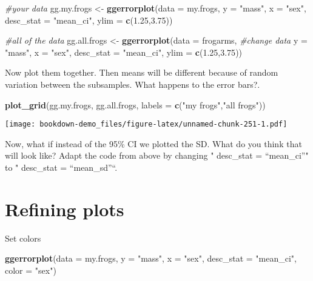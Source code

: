 \documentclass[]{book}
\newenvironment{Shaded}{\begin{snugshade}}{\end{snugshade}}
\newcommand{\KeywordTok}[1]{\textcolor[rgb]{0.13,0.29,0.53}{\textbf{#1}}}
\newcommand{\DataTypeTok}[1]{\textcolor[rgb]{0.13,0.29,0.53}{#1}}
\newcommand{\FloatTok}[1]{\textcolor[rgb]{0.00,0.00,0.81}{#1}}
\newcommand{\StringTok}[1]{\textcolor[rgb]{0.31,0.60,0.02}{#1}}
\newcommand{\CommentTok}[1]{\textcolor[rgb]{0.56,0.35,0.01}{\textit{#1}}}
\newcommand{\NormalTok}[1]{#1}
\theoremstyle{definition}
\theoremstyle{definition}
\theoremstyle{definition}
\theoremstyle{remark}
\begin{document}
\begin{Shaded}
\begin{Highlighting}[]
\CommentTok{#your data}
\NormalTok{gg.my.frogs <-}\StringTok{ }\KeywordTok{ggerrorplot}\NormalTok{(}\DataTypeTok{data =}\NormalTok{ my.frogs,}
          \DataTypeTok{y =} \StringTok{"mass"}\NormalTok{,}
          \DataTypeTok{x =} \StringTok{"sex"}\NormalTok{,}
          \DataTypeTok{desc_stat =} \StringTok{"mean_ci"}\NormalTok{,}
          \DataTypeTok{ylim =} \KeywordTok{c}\NormalTok{(}\FloatTok{1.25}\NormalTok{,}\FloatTok{3.75}\NormalTok{))}

\CommentTok{#all of the data}
\NormalTok{gg.all.frogs <-}\StringTok{ }\KeywordTok{ggerrorplot}\NormalTok{(}\DataTypeTok{data =}\NormalTok{ frogarms, }\CommentTok{#change data}
          \DataTypeTok{y =} \StringTok{"mass"}\NormalTok{,}
          \DataTypeTok{x =} \StringTok{"sex"}\NormalTok{,}
          \DataTypeTok{desc_stat =} \StringTok{"mean_ci"}\NormalTok{,}
          \DataTypeTok{ylim =} \KeywordTok{c}\NormalTok{(}\FloatTok{1.25}\NormalTok{,}\FloatTok{3.75}\NormalTok{))}
\end{Highlighting}
\end{Shaded}

Now plot them together. Then means will be different because of random
variation between the subsamples. What happens to the error bars?.

\begin{Shaded}
\begin{Highlighting}[]
\KeywordTok{plot_grid}\NormalTok{(gg.my.frogs, }
\NormalTok{          gg.all.frogs,}
          \DataTypeTok{labels =} \KeywordTok{c}\NormalTok{(}\StringTok{"my frogs"}\NormalTok{,}\StringTok{"all frogs"}\NormalTok{))}
\end{Highlighting}
\end{Shaded}

\texttt{[image: bookdown-demo\_files/figure-latex/unnamed-chunk-251-1.pdf]}

Now, what if instead of the 95\% CI we plotted the SD. What do you think
that will look like? Adapt the code from above by changing " desc\_stat
= ``mean\_ci''" to " desc\_stat = ``mean\_sd''``.

\section{Refining plots}\label{refining-plots}

Set colors

\begin{Shaded}
\begin{Highlighting}[]
\KeywordTok{ggerrorplot}\NormalTok{(}\DataTypeTok{data =}\NormalTok{ my.frogs,}
          \DataTypeTok{y =} \StringTok{"mass"}\NormalTok{,}
          \DataTypeTok{x =} \StringTok{"sex"}\NormalTok{,}
          \DataTypeTok{desc_stat =} \StringTok{"mean_ci"}\NormalTok{,}
          \DataTypeTok{color =} \StringTok{"sex"}\NormalTok{)}
\end{Highlighting}
\end{Shaded}
\end{document}
